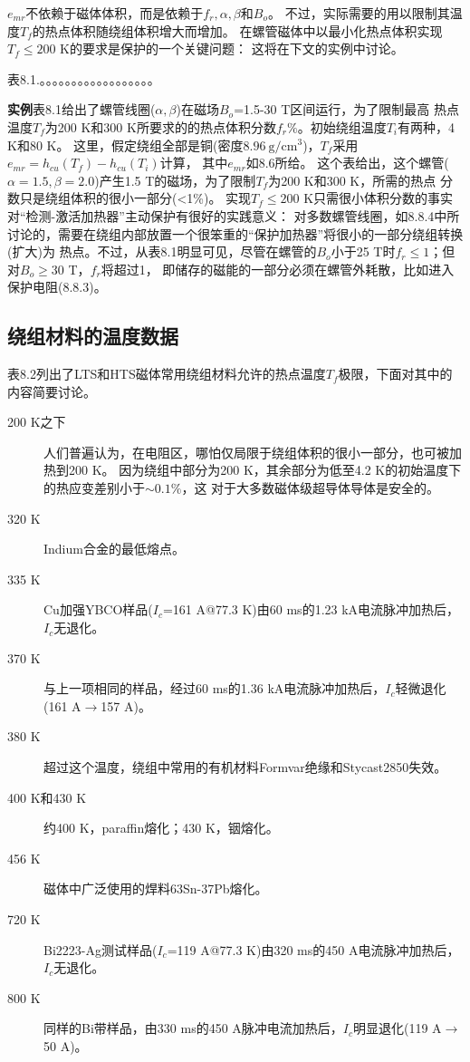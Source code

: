 $e_{mr}$不依赖于磁体体积，而是依赖于$f_r,\alpha,\beta$和$B_o$。
不过，实际需要的用以限制其温度$T_f$的热点体积随绕组体积增大而增加。
在螺管磁体中以最小化热点体积实现$T_f\le 200$ K的要求是保护的一个关键问题：
这将在下文的实例中讨论。

表8.1.。。。。。。。。。。。。。。。。。。

\textbf{实例}\quad 表8.1给出了螺管线圈($\alpha,\beta$)在磁场$B_o$=1.5-30 T区间运行，为了限制最高
热点温度$T_f$为200 K和300 K所要求的的热点体积分数$f_r\%$。初始绕组温度$T_i$有两种，4 K和80 K。
这里，假定绕组全部是铜(密度$8.96\ \mathrm{g/cm^3}$)，$T_f$采用$e_{mr}=h_{cu}(T_f)-h_{cu}(T_i)$计算，
其中$e_{mr}$如8.6所给。
这个表给出，这个螺管($\alpha=1.5,\beta=2.0$)产生1.5 T的磁场，为了限制$T_f$为200 K和300 K，所需的热点
分数只是绕组体积的很小一部分(<1\%)。
实现$T_f\le 200$ K只需很小体积分数的事实对“检测-激活加热器”主动保护有很好的实践意义：
对多数螺管线圈，如8.8.4中所讨论的，需要在绕组内部放置一个很笨重的“保护加热器”将很小的一部分绕组转换(扩大)为
热点。不过，从表8.1明显可见，尽管在螺管的$B_o$小于25 T时$f_r\le 1$；但对$B_o\ge 30$ T，$f_r$将超过1，
即储存的磁能的一部分必须在螺管外耗散，比如进入保护电阻(8.8.3)。

\subsection{绕组材料的温度数据}
表8.2列出了LTS和HTS磁体常用绕组材料允许的热点温度$T_f$极限，下面对其中的内容简要讨论。
\begin{description}
	\item[200 K之下] 人们普遍认为，在电阻区，哪怕仅局限于绕组体积的很小一部分，也可被加热到200 K。
	因为绕组中部分为200 K，其余部分为低至4.2 K的初始温度下的热应变差别小于$\sim 0.1\%$，这
	对于大多数磁体级超导体导体是安全的。
	\item[320 K] Indium合金的最低熔点。
	\item[335 K] Cu加强YBCO样品($I_c$=161 A@77.3 K)由60 ms的1.23 kA电流脉冲加热后，$I_c$无退化。
	\item[370 K] 与上一项相同的样品，经过60 ms的1.36 kA电流脉冲加热后，$I_c$轻微退化(161 A$\rightarrow$157 A)。
	\item[380 K] 超过这个温度，绕组中常用的有机材料Formvar绝缘和Stycast2850失效。
	\item[400 K和430 K] 约400 K，paraffin熔化；430 K，铟熔化。
	\item[456 K] 磁体中广泛使用的焊料63Sn-37Pb熔化。
	\item[720 K] Bi2223-Ag测试样品($I_c$=119 A@77.3 K)由320 ms的450 A电流脉冲加热后，$I_c$无退化。
	\item[800 K] 同样的Bi带样品，由330 ms的450 A脉冲电流加热后，$I_c$明显退化(119 A$\rightarrow$50 A)。
\end{description}

